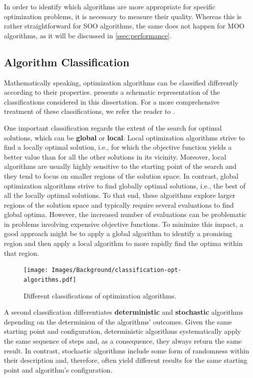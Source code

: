 	In order to identify which algorithms are more appropriate for specific optimization problems, it is necessary to measure their quality. Whereas this is rather straightforward for \ac{SOO} algorithms, the same does not happen for \ac{MOO} algorithms, as it will be discussed in \cref{ssec:performance}.
	
	\subsection{Algorithm Classification}	
	Mathematically speaking, optimization algorithms can be classified differently according to their properties.  presents a schematic representation of the classifications considered in this dissertation. For a more comprehensive treatment of these classifications, we refer the reader to \cite{Koziel2011, Nocedal2011NumericalOptimization}.
	
	One important classification regards the extent of the search for optimal solutions, which can be \textbf{global} or \textbf{local}. Local optimization algorithms strive to find a locally optimal solution, i.e., for which the objective function yields a better value than for all the other solutions in its vicinity. Moreover, local algorithms are usually highly sensitive to the starting point of the search and they tend to focus on smaller regions of the solution space. In contrast, global optimization algorithms strive to find globally optimal solutions, i.e., the best of all the locally optimal solutions. To that end, these algorithms explore larger regions of the solution space and typically require several evaluations to find global optima. However, the increased number of evaluations can be problematic in problems involving expensive objective functions. To minimize this impact, a good approach might be to apply a global algorithm to identify a promising region and then apply a local algorithm to more rapidly find the optima within that region. 
	
	
	\begin{figure}
		\centering
		\texttt{[image: Images/Background/classification-opt-algorithms.pdf]}
		\caption{Different classifications of optimization algorithms.}
		\label{fig:optALGOclassification}
	\end{figure}
	
	A second classification differentiates \textbf{deterministic} and \textbf{stochastic} algorithms depending on the determinism of the algorithms' outcomes. Given the same starting point and configuration, deterministic algorithms systematically apply the same sequence of steps and, as a consequence, they always return the same result. In contrast, stochastic algorithms include some form of randomness within their description and, therefore, often yield different results for the same starting point and algorithm's configuration.
		
